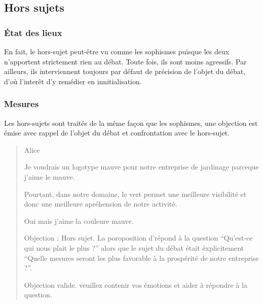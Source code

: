 \subsection{Hors sujets}
\subsubsection{État des lieux}
En fait, le hors-sujet peut-être vu comme les sophismes puisque les deux n’apportent strictement rien au débat. Toute fois, ils sont moins agressifs. Par ailleurs, ils interviennent toujours par défaut de précision de l’objet du débat, d’où l’interêt d’y remédier en innitialisation.

\subsubsection{Mesures}
Les hors-sujets sont traités de la même façon que les sophismes, une objection est émise avec rappel de l’objet du débat et confrontation avec le hors-sujet.

\begin{quote}
  \begin{drama}{0cm}{0cm}{Alice}

    \Aspeaks       Je voudrais un logotype mauve pour notre entreprise de jardinage parceque j’aime le mauve.

    \Bspeaks       Pourtant, dans notre domaine, le vert permet une meilleure visibilité et donc une meilleure apréhension de notre activité.

    \Aspeaks       Oui mais j’aime la couleure mauve.

    \Bspeaks       Objection : Hors sujet. La poroposition d’\A répond à la question \enquote{Qu’est-ce qui nous plait le plus ?} alors que le sujet du débat était éxplicitement \enquote{Quelle mesures seront les plus favorable à la prospérité de notre entreprise ?}.

    \Arbitrespeaks Objection valide. \A veuillez contenir vos émotions et aider à répondre à la question.

  \end{drama}
\end{quote}
